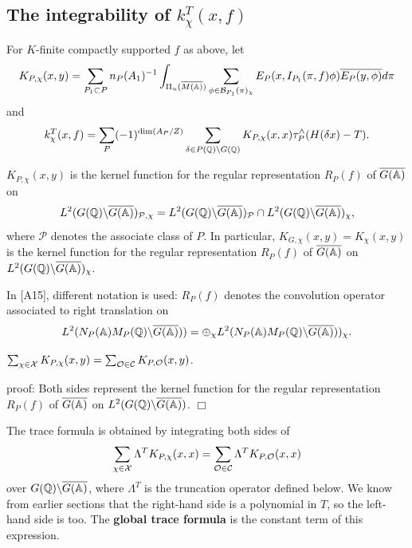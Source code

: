 
\subsection{The integrability of $k_\chi ^T(x,f)$}

For $K$-finite compactly supported $f$ as above, let 
\begin{equation}
K_{P,\chi }(x,y)=\sum_{P_1\subset P}n_P(A_1)^{-1}
\int_{\Pi _u(\overline{M(\mathbb{A} )})}
\sum_{\phi \in {\cal{B}}_{P_1}(\pi )_\chi }
E_P(x,I_{P_1}(\pi ,f)\phi )\overline{E_P(y,\phi )}d\pi
\end{equation}
and 
\begin{equation}
k_\chi ^T(x,f)=\sum_P(-1)^{\dim (A_P/Z)}
\sum_{\delta \in P(\mathbb{Q} )\backslash G(\mathbb{Q} )}
K_{P,\chi }(x,x)\tau _P^{\wedge }(H(\delta x)-T).
\end{equation}

\begin{lemma}
$K_{P,\chi }(x,y)$ is the kernel function for the regular 
representation $R_P(f)$ of $\overline{G(\mathbb{A} )}$ on 
\[
L^2(G(\mathbb{Q} )\backslash \overline{G(\mathbb{A} )})_{\mathcal{P},\chi }
=L^2(G(\mathbb{Q} )\backslash \overline{G(\mathbb{A} )})_{\mathcal{P}}
\cap L^2(G(\mathbb{Q} )\backslash \overline{G(\mathbb{A} )})_{\chi},
\]
where $\mathcal{P}$ denotes the associate class of $P$. In particular,
$K_{G,\chi }(x,y)=K_\chi (x,y)$ is the kernel function for the regular
representation $R_P(f)$ of $\overline{G(\mathbb{A} )}$ on
$L^2(G(\mathbb{Q} )\backslash \overline{G(\mathbb{A} )})_\chi $.
\end{lemma}

\begin{remark} In [A15], different notation is used: $R_P(f)$ denotes
the convolution operator associated to right translation on
\[
L^2(N_P(\mathbb{A} )M_P(\mathbb{Q} )\backslash \overline{G(\mathbb{A} )}))
=\oplus_\chi
L^2(N_P(\mathbb{A} )M_P(\mathbb{Q} )\backslash \overline{G(\mathbb{A} )}))_\chi .
\]
\end{remark}

\begin{theorem}
$\sum_{\chi \in \mathcal{X}}K_{P,\chi }(x,y)
=\sum_{{\cal O}\in \mathcal{C}}
K_{P,{\cal O}}(x,y)$.
\end{theorem}

proof: Both sides represent the kernel function for the regular
representation $R_P(f)$ of $\overline{G(\mathbb{A} )}$
on $L^2(G(\mathbb{Q} )\backslash \overline{G(\mathbb{A} )})$. $\Box $

The trace formula is obtained by integrating both sides of 
\[
\sum_{\chi \in \mathcal{X}}\Lambda ^TK_{P,\chi }(x,x)
=\sum_{{\cal O}\in \mathcal{C}}
\Lambda ^TK_{P,{\cal O}}(x,x) 
\]
over $G(\mathbb{Q} )\backslash \overline{G(\mathbb{A} )}$,
where $\Lambda ^T$ is the
truncation operator defined below. We know from earlier sections that the
right-hand side is a polynomial in $T$, so the left-hand side is too. The 
\textbf{global trace formula} is the constant term of this expression. 

